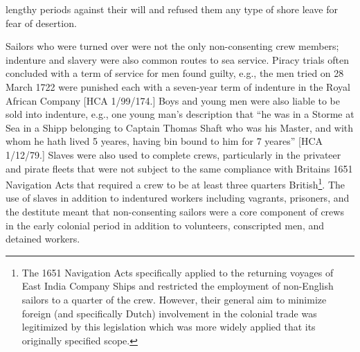 \begin{styleStandard}
lengthy periods against their will and refused them any type of shore leave for fear of desertion. 
\end{styleStandard}


\begin{styleStandard}
Sailors who were turned over were not the only non-consenting crew members; indenture and slavery were also common routes to sea service. Piracy trials often concluded with a term of service for men found guilty, e.g., the men tried on 28 March 1722 were punished each with a seven-year term of indenture in the Royal African Company [HCA 1/99/174.] Boys and young men were also liable to be sold into indenture, e.g., one young man’s description that “he was in a Storme at Sea in a Shipp belonging to Captain Thomas Shaft who was his Master, and with whom he hath lived 5 yeares, having bin bound to him for 7 yeares” [HCA 1/12/79.] Slaves were also used to complete crews, particularly in the privateer and pirate fleets that were not subject to the same compliance with Britain{\textquotesingle}s 1651 Navigation Acts that required a crew to be at least three quarters British\footnote{ The 1651 Navigation Acts specifically applied to the returning voyages of East India Company Ships and restricted the employment of non-English sailors to a quarter of the crew. However, their general aim to minimize foreign (and specifically Dutch) involvement in the colonial trade was legitimized by this legislation which was more widely applied that its originally specified scope. }. The use of slaves in addition to indentured workers including vagrants, prisoners, and the destitute meant that non-consenting sailors were a core component of crews in the early colonial period in addition to volunteers, conscripted men, and detained workers. 
\end{styleStandard}


